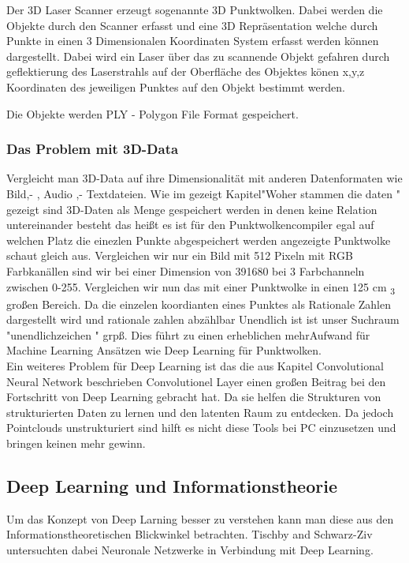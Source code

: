 \documentclass{llncs}
\begin{document}
Der 3D Laser Scanner erzeugt sogenannte 3D Punktwolken. Dabei werden die Objekte durch den Scanner erfasst und eine 3D Repräsentation welche durch Punkte in einen 3 Dimensionalen Koordinaten System erfasst werden können dargestellt. Dabei wird ein Laser über das zu scannende Objekt gefahren durch geflektierung des Laserstrahls auf der Oberfläche des Objektes könen x,y,z Koordinaten des jeweiligen Punktes auf den Objekt bestimmt werden.

Die Objekte werden PLY - Polygon File Format gespeichert.

\subsubsection{Das Problem mit 3D-Data}

Vergleicht man 3D-Data auf ihre Dimensionalität mit anderen Datenformaten wie Bild,- , Audio ,- Textdateien. Wie im gezeigt Kapitel"Woher stammen die daten " gezeigt sind 3D-Daten als Menge gespeichert werden in denen keine Relation untereinander besteht das heißt es ist für den Punktwolkencompiler egal auf welchen Platz die einezlen Punkte abgespeichert werden angezeigte Punktwolke schaut gleich aus. Vergleichen wir nur ein Bild mit 512 Pixeln mit RGB Farbkanällen sind wir bei einer Dimension von 391680 bei 3 Farbchanneln zwischen 0-255. Vergleichen wir nun das mit einer Punktwolke in einen 125 cm \textsubscript{3} großen Bereich. Da die einzelen koordianten eines Punktes als Rationale Zahlen dargestellt wird und rationale zahlen abzählbar Unendlich ist ist unser Suchraum "unendlichzeichen " grpß. Dies führt zu einen erheblichen mehrAufwand für Machine Learning Ansätzen wie Deep Learning für Punktwolken.\\

Ein weiteres Problem für Deep Learning ist das die aus Kapitel Convolutional Neural Network beschrieben Convolutionel Layer einen großen Beitrag bei den Fortschritt von Deep Learning gebracht hat. Da sie helfen die Strukturen von strukturierten Daten zu lernen und den latenten Raum zu entdecken. Da jedoch Pointclouds unstrukturiert sind hilft es nicht diese Tools bei PC einzusetzen und bringen keinen mehr gewinn. 


\subsection{Deep Learning und Informationstheorie}


Um das Konzept von Deep Larning besser zu verstehen kann man diese aus den Informationstheoretischen Blickwinkel betrachten. Tischby and Schwarz-Ziv  \cite{infoth} untersuchten dabei Neuronale Netzwerke in Verbindung mit Deep Learning. 
\end{document}
